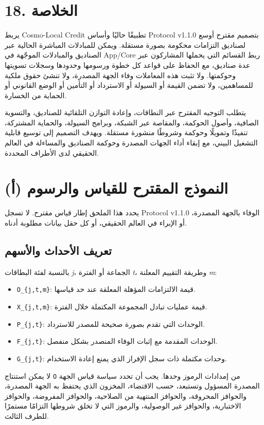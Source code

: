 \documentclass[11pt]{article}
\begin{document}
\section*{18. الخلاصة}

يربط Cosmo-Local Credit تطبيقًا حاليًا وأساس Protocol v1.1.0 بتصميم مقترح أوسع لصناديق التزامات محكومة بصورة مستقلة. ويمكن للمبادلات المباشرة الحالية عبر الصناديق والمبادلات الموجّهة في App/Core ربط القسائم التي يحملها المشاركون عبر عدة صناديق، مع الحفاظ على قواعد كل خطوة ورسومها وحدودها وسجلات تسويتها وحوكمتها. ولا تثبت هذه المعاملات وفاء الجهة المصدرة، ولا تنشئ حقوق ملكية للمساهمين، ولا تضمن القيمة أو السيولة أو الاسترداد أو التأمين أو الوضع القانوني أو الحماية من الخسارة.

يتطلب التوجيه المقترح عبر النطاقات، وإعادة التوازن التلقائية للصناديق، والتسوية الصافية، وأصول الحوكمة، والمقاصة عبر الشبكة، وبرامج السيولة، والحماية المشتركة، تنفيذًا وتمويلًا وحوكمة وشروطًا منشورة مستقلة. ويهدف التصميم إلى توسيع قابلية التشغيل البيني، مع إبقاء أداء الجهات المصدرة وحوكمة الصناديق والمساءلة في العالم الحقيقي لدى الأطراف المحددة.


\section*{(أ) النموذج المقترح للقياس والرسوم}

يحدد هذا الملحق إطار قياس مقترح. لا تسجل Protocol v1.1.0 الوفاء بالجهة المصدرة، أو الإبراء في العالم الحقيقي، أو كل حقل بيانات مطلوبة أدناه.

\subsection*{تعريف الأحداث والأسهم}

بالنسبة لفئة البطاقات \emph{j}، الجماعة أو الفترة \emph{t}، وطريقة التقييم المعلنة \emph{m}:

\begin{itemize}[leftmargin=*]
\item \texttt{O\_\{j,t,m\}}: قيمة الالتزامات المؤهلة المعلقة عند حد قياسها.
\item \texttt{X\_\{j,t,m\}}: قيمة عمليات تبادل المجموعة المكتملة خلال الفترة.
\item \texttt{P\_\{j,t\}}: الوحدات التي تقدم بصورة صحيحة للمصدر للاسترداد.
\item \texttt{F\_\{j,t\}}: الوحدات المقدمة مع إثبات الوفاء المنصدر بشكل منفصل.
\item \texttt{G\_\{j,t\}}: وحدات مكتملة ذات سجل الإفراز الذي يمنع إعادة الاستخدام.
\end{itemize}
لا يمكن استنتاج \texttt{O} من إمدادات الرموز وحدها. يجب أن تحدد سياسة قياس الجهة المصدرة المسؤول وتستبعد، حسب الاقتضاء، المخزون الذي يحتفظ به الجهة المصدرة، والحوافز المحروقة، والحوافز المنتهية من الصلاحية، والحوافز المفروضة، والحوافز الاختبارية، والحوافز غير الوصولية، والرموز التي لا تخلق شروطها التزامًا مستمرًا للطرف الثالث.
\end{document}
